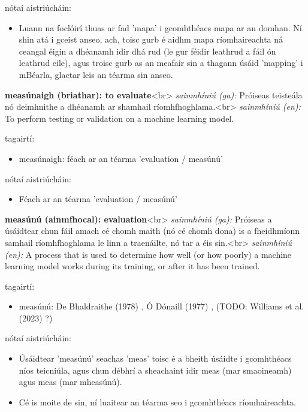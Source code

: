 \documentclass{article}
\begin{document}
nótaí aistriúcháin:
\begin{itemize}
	\item Luann na foclóirí thuas ar fad 'mapa' i gcomhthéacs mapa ar an domhan. Ní shin atá i gceist anseo, ach, toisc gurb é aidhm mapa ríomhaireachta ná ceangal éigin a dhéanamh idir dhá rud (le gur féidir leathrud a fáil ón leathrud eile), agus troisc gurb as an meafair sin a thagann úsáid 'mapping' i mBéarla, glactar leis an téarma sin anseo.
\end{itemize}


\textbf{measúnaigh (briathar): to evaluate}<br>
\textit{sainmhíniú (ga):} Próiseas teisteála nó deimhnithe a dhéanamh ar shamhail ríomhfhoghlama.<br>
\textit{sainmhíniú (en):} To perform testing or validation on a machine learning model.

tagairtí:
\begin{itemize}
	\item measúnaigh: féach ar an téarma 'evaluation / measúnú'
\end{itemize}

nótaí aistriúcháin:
\begin{itemize}
	\item Féach ar an téarma 'evaluation / measúnú'
\end{itemize}


\textbf{measúnú (ainmfhocal): evaluation}<br>
\textit{sainmhíniú (ga):} Próiseas a úsáidtear chun fáil amach cé chomh maith (nó cé chomh dona) is a fheidhmíonn samhail ríomhfhoghlama le linn a traenáilte, nó tar a éis sin.<br>
\textit{sainmhíniú (en):} A process that is used to determine how well (or how poorly) a machine learning model works during its training, or after it has been trained.

tagairtí:
\begin{itemize}
	\item measúnú: De Bhaldraithe (1978) \cite{de-bhaldraithe}, Ó Dónaill (1977) \cite{odonaill}, (TODO: Williams et al. (2023) \cite{storchiste}?)
\end{itemize}

nótaí aistriúcháin:
\begin{itemize}
	\item Úsáidtear 'measúnú' seachas 'meas' toisc é a bheith úsáidte i gcomhthéacs níos teicniúla, agus chun débhrí a sheachaint idir meas (mar smaoineamh) agus meas (mar mheasúnú).
	\item Cé is moite de sin, ní luaitear an téarma seo i gcomhthéacs ríomhaireachta.
\end{itemize}
\end{document}
